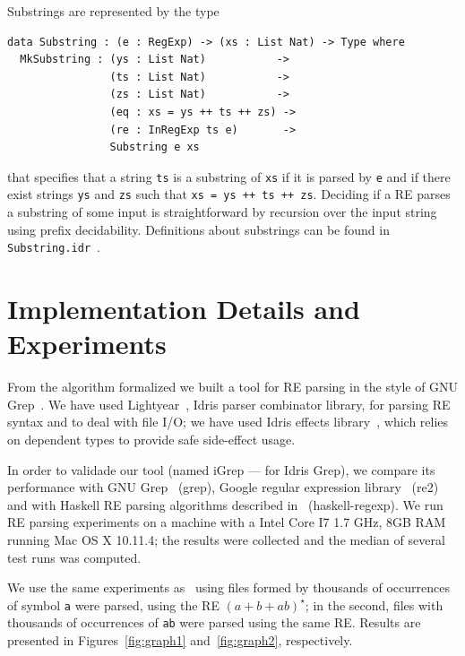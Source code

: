 \documentclass{llncs}
\newcommand{\idris}[1]{\texttt{#1}}%
\begin{document}
Substrings are represented by the type
\begin{verbatim}
data Substring : (e : RegExp) -> (xs : List Nat) -> Type where
  MkSubstring : (ys : List Nat)           ->
                (ts : List Nat)           ->
                (zs : List Nat)           ->
                (eq : xs = ys ++ ts ++ zs) ->
                (re : InRegExp ts e)       ->
                Substring e xs
\end{verbatim}
that specifies that a string \idris{ts} is a substring of \idris{xs}
if it is parsed by \idris{e} and if there exist strings \idris{ys} and
\idris{zs} such that \idris{xs = ys ++ ts ++ zs}. Deciding if a RE
parses a substring of some input is straightforward by recursion over
the input string using prefix decidability. Definitions about
substrings can be found in \texttt{Substring.idr}~\cite{regex-rep}.

\section{Implementation Details and Experiments}\label{sec:exp}

From the algorithm formalized we built a tool for RE parsing in the
style of GNU Grep~\cite{Grep}. We have used
Lightyear~\cite{lightyear}, Idris parser combinator library, for
parsing RE syntax and to deal with file I/O; we have used Idris
effects library~\cite{Brady2013a}, which relies on dependent types to
provide safe side-effect usage.

In order to validade our tool (named iGrep --- for Idris Grep), we
compare its performance with GNU Grep~\cite{Grep} (grep), Google
regular expression library~\cite{re2} (re2) and with Haskell RE
parsing algorithms described in~\cite{Fischer2010} (haskell-regexp).
We run RE parsing experiments on a machine with a Intel Core I7 1.7
GHz, 8GB RAM running Mac OS X 10.11.4; the results were collected and
the median of several test runs was computed.

We use the same experiments as~\cite{SulzmannL14} using files formed
by thousands of occurrences of
symbol \texttt{a} were parsed, using the RE $(a + b + ab)^\star$; in
the second, files with thousands of occurrences of \texttt{ab} were
parsed using the same RE. Results are presented in
Figures~\ref{fig:graph1} and~\ref{fig:graph2}, respectively.
\end{document}
